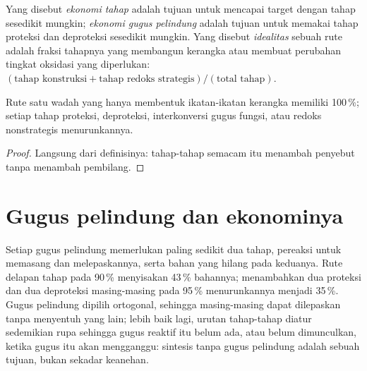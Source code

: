 \begin{definition}\label{def:b3:total-synthesis:economy}
Yang disebut \emph{ekonomi tahap} adalah tujuan untuk mencapai target dengan
tahap sesedikit mungkin; \emph{ekonomi gugus pelindung}
adalah tujuan untuk memakai tahap proteksi dan deproteksi sesedikit mungkin. Yang disebut
\emph{idealitas} sebuah rute adalah fraksi tahapnya yang
membangun kerangka atau membuat perubahan tingkat oksidasi yang diperlukan:
$(\text{tahap konstruksi} + \text{tahap redoks strategis})/(\text{total tahap})$.
\end{definition}

\begin{proposition}\label{prop:b3:total-synthesis:ideality}
Rute satu wadah yang hanya membentuk ikatan-ikatan kerangka memiliki  100\,\%; setiap tahap proteksi,
deproteksi, interkonversi gugus fungsi, atau redoks nonstrategis
menurunkannya.
\end{proposition}

\begin{proof}
Langsung dari definisinya: tahap-tahap semacam itu menambah penyebut tanpa menambah
pembilang.
\end{proof}

\section{Gugus pelindung dan ekonominya}

Setiap gugus pelindung memerlukan paling sedikit dua tahap, pereaksi untuk memasang dan
melepaskannya, serta bahan yang hilang pada keduanya. Rute delapan tahap pada 90\,\% menyisakan
43\,\% bahannya; menambahkan dua proteksi dan dua deproteksi masing-masing pada 95\,\%
menurunkannya menjadi 35\,\%. Gugus pelindung dipilih ortogonal, sehingga masing-masing dapat
dilepaskan tanpa menyentuh yang lain; lebih baik lagi, urutan tahap-tahap
diatur sedemikian rupa sehingga gugus reaktif itu belum ada, atau belum dimunculkan, ketika
gugus itu akan mengganggu: sintesis tanpa gugus pelindung adalah sebuah tujuan, bukan sekadar keanehan.

